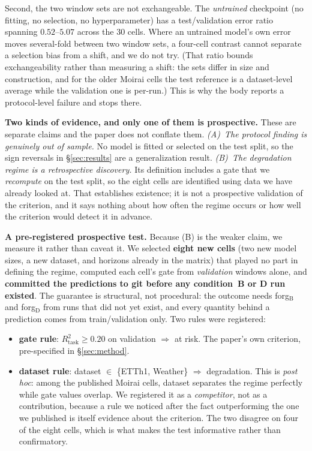 \documentclass{article}
\begin{document}
Second, the two window sets are not exchangeable. The \emph{untrained} checkpoint (no fitting, no
selection, no hyperparameter) has a test/validation error ratio spanning $0.52$--$5.07$ across the
30 cells. Where an untrained model's own error moves several-fold between two window sets, a
four-cell contrast cannot separate a selection bias from a shift, and we do not try. (That ratio
bounds exchangeability rather than measuring a shift: the sets differ in size and construction, and
for the older Moirai cells the test reference is a dataset-level average while the validation one is
per-run.) This is why the body reports a protocol-level failure and stops there.

\textbf{Two kinds of evidence, and only one of them is prospective.} These are separate claims and
the paper does not conflate them. \emph{(A)~The protocol finding is genuinely out of sample.} No
model is fitted or selected on the test split, so the sign reversals in \S\ref{sec:results} are a
generalization result. \emph{(B)~The degradation regime is a retrospective discovery.} Its
definition includes a gate that we \emph{recompute} on the test split, so the eight cells are
identified using data we have already looked at. That establishes existence; it is not a prospective
validation of the criterion, and it says nothing about how often the regime occurs or how well the
criterion would detect it in advance.

\textbf{A pre-registered prospective test.} Because (B) is the weaker claim, we measure it rather
than caveat it. We selected \textbf{eight new cells} (two new model sizes, a new dataset, and
horizons already in the matrix) that played no part in defining the regime, computed each cell's
gate from \emph{validation} windows alone, and \textbf{committed the predictions to git before any
condition~B or D run existed}. The guarantee is structural, not procedural: the outcome needs
forg$_\text{B}$ and forg$_\text{D}$ from runs that did not yet exist, and every quantity behind a
prediction comes from train/validation only. Two rules were registered:

\begin{itemize}[leftmargin=1.2em,itemsep=1pt,topsep=2pt]
\item \textbf{gate rule}: $R^2_\text{task}\ge0.20$ on validation $\Rightarrow$ at risk. The
      paper's own criterion, pre-specified in \S\ref{sec:method}.
\item \textbf{dataset rule}: dataset $\in$ \{ETTh1, Weather\} $\Rightarrow$ degradation. This is
      \emph{post hoc}: among the published Moirai cells, dataset separates the regime perfectly
      while gate values overlap. We registered it as a \emph{competitor}, not as a contribution,
      because a rule we noticed after the fact outperforming the one we published is itself
      evidence about the criterion. The two disagree on four of the eight cells, which is what
      makes the test informative rather than confirmatory.
\end{itemize}
\end{document}
